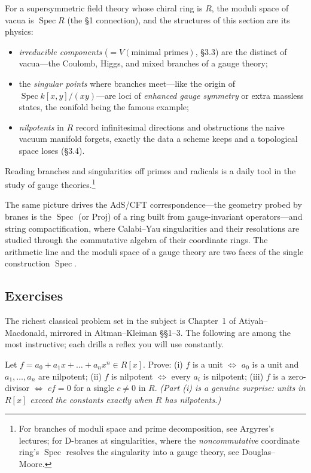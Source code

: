 \documentclass[11pt]{article}
\DeclareMathOperator{\Spec}{Spec}
\begin{document}
\begin{iidea}
For a supersymmetric field theory whose chiral ring is $R$, the moduli space of vacua is
$\Spec R$ (the \S1 connection), and the structures of this section are its physics:
\begin{itemize}\setlength{\itemsep}{2pt}
\item \emph{irreducible components} ($=V(\text{minimal primes})$, \S3.3) are the distinct
 of vacua---the Coulomb, Higgs, and mixed branches of a gauge theory;
\item the \emph{singular points} where branches meet---like the origin of $\Spec k[x,y]/(xy)$---are
loci of \emph{enhanced gauge symmetry} or extra massless states, the conifold being the famous
example;
\item \emph{nilpotents} in $R$ record infinitesimal directions and obstructions the naive
vacuum manifold forgets, exactly the data a scheme keeps and a topological space loses (\S3.4).
\end{itemize}
Reading branches and singularities off primes and radicals is a daily tool in the study of
gauge theories.\footnote{For branches of moduli space and prime decomposition, see Argyres's
lectures; for D-branes at singularities, where the \emph{noncommutative} coordinate ring's
$\Spec$ resolves the singularity into a  gauge theory, see Douglas--Moore.}
\end{iidea}

\noindent
The same picture drives the AdS/CFT correspondence---the geometry probed by branes is the
$\Spec$ (or $\mathrm{Proj}$) of a ring built from gauge-invariant operators---and string
compactification, where Calabi--Yau singularities and their resolutions are studied through the
commutative algebra of their coordinate rings. The arithmetic line and the moduli space of a
gauge theory are two faces of the single construction $\Spec$.

\subsection{Exercises}

\noindent
The richest classical problem set in the subject is Chapter~1 of Atiyah--Macdonald, mirrored in
Altman--Kleiman \S\S1--3. The following are among the most instructive; each drills a reflex you
will use constantly.

\begin{xca}
Let $f=a_0+a_1x+\dots+a_nx^n\in R[x]$. Prove: (i) $f$ is a unit $\iff$ $a_0$ is a unit and
$a_1,\dots,a_n$ are nilpotent; (ii) $f$ is nilpotent $\iff$ every $a_i$ is nilpotent; (iii) $f$
is a zero-divisor $\iff$ $cf=0$ for a single $c\neq0$ in $R$. \emph{(Part (i) is a genuine
surprise: units in $R[x]$ exceed the constants exactly when $R$ has nilpotents.)}
\end{xca}
\end{document}
